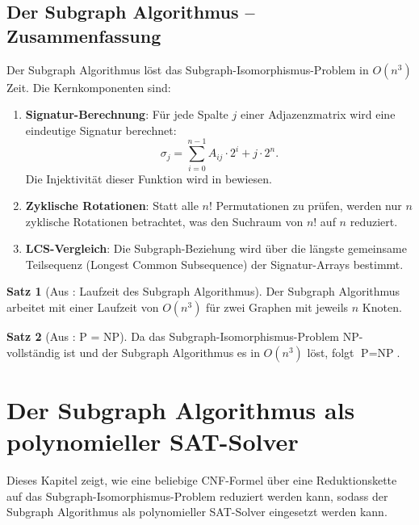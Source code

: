 ﻿\documentclass[a4paper,12pt]{article}
\theoremstyle{definition}
\newtheorem{satz}{Satz}
\begin{document}
\subsection{Der Subgraph Algorithmus -- Zusammenfassung}

Der Subgraph Algorithmus \cite{Epp26, Epp26} löst das Subgraph-Isomorphismus-Problem in $O(n^3)$ Zeit. Die Kernkomponenten sind:

\begin{enumerate}
    \item \textbf{Signatur-Berechnung}: Für jede Spalte $j$ einer Adjazenzmatrix wird eine eindeutige Signatur berechnet:
    \[
    \sigma_j = \sum_{i=0}^{n-1} A_{ij} \cdot 2^i + j \cdot 2^n.
    \]
    Die Injektivität dieser Funktion wird in \cite{Epp26} bewiesen.
    
    \item \textbf{Zyklische Rotationen}: Statt alle $n!$ Permutationen zu prüfen, werden nur $n$ zyklische Rotationen betrachtet, was den Suchraum von $n!$ auf $n$ reduziert.
    
    \item \textbf{LCS-Vergleich}: Die Subgraph-Beziehung wird über die längste gemeinsame Teilsequenz (Longest Common Subsequence) der Signatur-Arrays bestimmt.
\end{enumerate}

\begin{satz}[Aus \cite{Epp26}: Laufzeit des Subgraph Algorithmus]
    Der Subgraph Algorithmus arbeitet mit einer Laufzeit von $O(n^3)$ für zwei Graphen mit jeweils $n$ Knoten.
\end{satz}

\begin{satz}[Aus \cite{Epp26}: P = NP]
    Da das Subgraph-Isomorphismus-Problem NP-vollständig ist und der Subgraph Algorithmus es in $O(n^3)$ löst, folgt $\text{P} = \text{NP}$.
\end{satz}

\section{Der Subgraph Algorithmus als polynomieller SAT-Solver}

Dieses Kapitel zeigt, wie eine beliebige CNF-Formel über eine Reduktionskette auf das Subgraph-Isomorphismus-Problem reduziert werden kann, sodass der Subgraph Algorithmus als polynomieller SAT-Solver eingesetzt werden kann.
\end{document}
